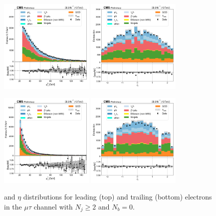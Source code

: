 \begin{figure}[htb!]
    \centering
    \includegraphics[width=0.4\textwidth]{chapters/Appendix/sectionPlots/figures/data_mc_overlays/mutau_2016_cat_gt2_eq0_signal_linear_lepton_lepton1_pt}
    \includegraphics[width=0.4\textwidth]{chapters/Appendix/sectionPlots/figures/data_mc_overlays/mutau_2016_cat_gt2_eq0_signal_linear_lepton_lepton1_eta}

    \includegraphics[width=0.4\textwidth]{chapters/Appendix/sectionPlots/figures/data_mc_overlays/mutau_2016_cat_gt2_eq0_signal_linear_lepton_lepton2_pt}
    \includegraphics[width=0.4\textwidth]{chapters/Appendix/sectionPlots/figures/data_mc_overlays/mutau_2016_cat_gt2_eq0_signal_linear_lepton_lepton2_eta}
    \caption{\pt and $\eta$ distributions for leading (top) and trailing
        (bottom) electrons in the $\mu\tau$ channel with $N_{j} \geq 2$ and
        $N_{b} = 0$.}
    \label{fig:mutau_4_kinematic}
\end{figure}

